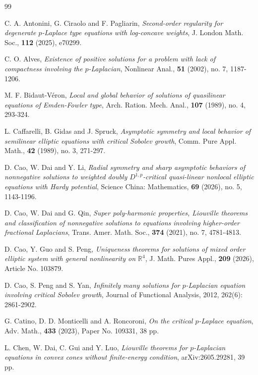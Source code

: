 \documentclass[12pt]{amsart}
\theoremstyle{definition}
\theoremstyle{remark}
\theoremstyle{conclusion}
\theoremstyle{conjecture}
\numberwithin{equation}{section}
\begin{document}
\begin{thebibliography}{99}

 C. A. Antonini, G. Ciraolo and F. Pagliarin, {\it Second-order regularity for degenerate $p$-Laplace type equations with log-concave weights}, J. London Math. Soc., \textbf{112} (2025), e70299.

 C. O. Alves, {\it Existence of positive solutions for a problem with lack of compactness involving the $p$-Laplacian}, Nonlinear Anal., \textbf{51} (2002), no. 7, 1187-1206.

 M. F. Bidaut-V\'{e}ron, {\it Local and global behavior of solutions of quasilinear equations of Emden-Fowler type}, Arch. Ration. Mech. Anal., \textbf{107} (1989), no. 4, 293-324.

 L. Caffarelli, B. Gidas and J. Spruck, {\it Asymptotic symmetry and local behavior of semilinear elliptic equations with critical Sobolev growth}, Comm. Pure Appl. Math., \textbf{42} (1989), no. 3, 271-297.

 D. Cao, W. Dai and Y. Li, {\it Radial symmetry and sharp asymptotic behaviors of nonnegative solutions to weighted doubly $D^{1,p}$-critical quasi-linear nonlocal elliptic equations with Hardy potential}, Science China: Mathematics, \textbf{69} (2026), no. 5, 1143-1196.

 D. Cao, W. Dai and G. Qin, {\it Super poly-harmonic properties, Liouville theorems and classification of nonnegative solutions to equations involving higher-order fractional Laplacians}, Trans. Amer. Math. Soc., \textbf{374} (2021), no. 7, 4781-4813.

 D. Cao, Y. Guo and S. Peng, {\it Uniqueness theorems for solutions of mixed order elliptic system with general nonlinearity on $\mathbb{R}^{4}$}, J. Math. Pures Appl., \textbf{209} (2026), Article No. 103879.

 D. Cao, S. Peng and S. Yan, {\it Infinitely many solutions for $p$-Laplacian equation involving critical Sobolev growth}, Journal of Functional Analysis, 2012, 262(6): 2861-2902.

 G. Catino, D. D. Monticelli and A. Roncoroni, {\it On the critical $p$-Laplace equation}, Adv. Math., \textbf{433} (2023), Paper No. 109331, 38 pp.

 L. Chen, W. Dai, C. Gui and Y. Luo, {\it Liouville theorems for $p$-Laplacian equations in convex cones without finite-energy condition}, arXiv:2605.29281, 39 pp.


\end{thebibliography}
\end{document}
